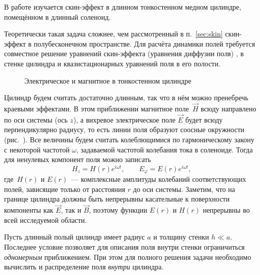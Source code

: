 


В работе изучается скин-эффект в длинном тонкостенном медном цилиндре, 
помещённом в длинный соленоид.

Теоретически такая задача сложнее,
чем рассмотренный в п.~\ref{sec:skin} скин-эффект в полубесконечном пространстве.
Для расчёта динамики полей требуется совместное решение уравнений
скин-эффекта (уравнения диффузии поля) ,
 в стенке цилиндра и квазистационарных 
уравнений поля в его полости.

\begin{wrapfigure}{o}{0.4\textwidth}
    \caption{Электрическое и магнитное в тонкостенном цилиндре}
\end{wrapfigure}
Цилиндр будем считать достаточно длинным, так что в нём можно пренебречь
краевыми эффектами. 
В этом приближении магнитное поле~$\vec{H}$ всюду направлено
по оси системы (ось $z$), а вихревое электрическое поле $\vec{E}$ 
будет всюду перпендикулярно радиусу, то есть линии поля образуют соосные окружности
(рис.~).
Все величины будем считать колеблющимися по гармоническому закону 
с некоторой частотой $\omega$, задаваемой частотой колебания тока
в соленоиде. Тогда для ненулевых компонент поля можно записать
\[
H_z = H(r) e^{i\omega t},\qquad E_{\varphi} = E(r) e^{i\omega t},
\]
где~$H(r)$ и $E(r)$~--- комплексные амплитуды колебаний соответствующих полей, 
зависящие только от расстояния $r$ до оси системы.
Заметим, что на границе цилиндра должны быть непрерывны касательные
к поверхности компоненты как $\vec{E}$, так и $\vec{B}$, 
поэтому функции $E(r)$ и $H(r)$ непрерывны во всей исследуемой области.

Пусть длинный полый цилиндр имеет радиус $a$ и толщину стенки $h \ll a$. 
Последнее условие позволяет для описания поля внутри стенки
ограничиться \emph{одномерным} приближением. При этом для полного 
решения задачи необходимо вычислить и распределение поля \emph{внутри} цилиндра. 

